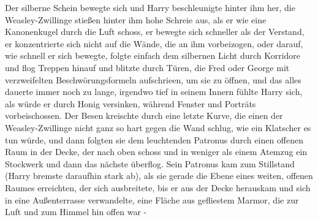 Der silberne Schein bewegte sich und Harry beschleunigte hinter ihm her, die
Weasley-Zwillinge stießen hinter ihm hohe Schreie aus, als er wie eine
Kanonenkugel durch die Luft schoss, er bewegte sich schneller als der Verstand,
er konzentrierte sich nicht auf die Wände, die an ihm vorbeizogen, oder darauf,
wie schnell er sich bewegte, folgte einfach dem silbernen Licht durch Korridore
und flog Treppen hinauf und blitzte durch Türen, die Fred oder George mit
verzweifelten Beschwörungsformeln aufschrieen, um sie zu öffnen, und das alles
dauerte immer noch zu lange, irgendwo tief in seinem Innern fühlte Harry sich,
als würde er durch Honig versinken, während Fenster und Porträts vorbeischossen.
Der Besen kreischte durch eine letzte Kurve, die einen der Weasley-Zwillinge
nicht ganz so hart gegen die Wand schlug, wie ein Klatscher es tun würde, und
dann folgten sie dem leuchtenden Patronus durch einen offenen Raum in der Decke,
der nach oben schoss und in weniger als einem Atemzug ein Stockwerk und dann das
nächste überflog. Sein Patronus kam zum Stillstand (Harry bremste daraufhin
stark ab), als sie gerade die Ebene eines weiten, offenen Raumes erreichten, der
sich ausbreitete, bis er aus der Decke herauskam und sich in eine Außenterrasse
verwandelte, eine Fläche aus gefliestem Marmor, die zur Luft und zum Himmel hin
offen war -


